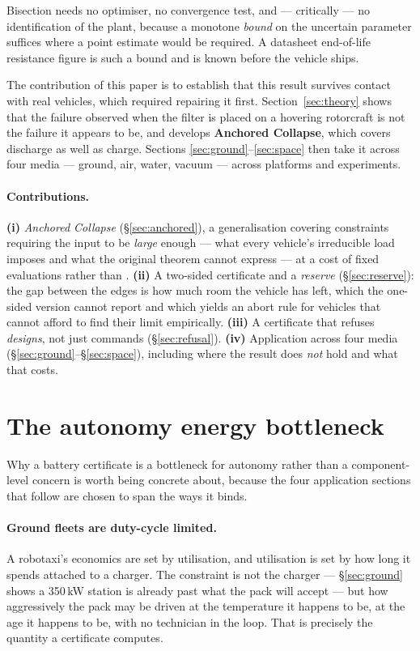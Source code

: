 \documentclass[11pt,letterpaper]{article}
\theoremstyle{definition}
\theoremstyle{remark}
\begin{document}
Bisection needs no optimiser, no convergence test, and --- critically --- no identification of
the plant, because a monotone \emph{bound} on the uncertain parameter suffices where a point
estimate would be required. A datasheet end-of-life resistance figure is such a bound and is
known before the vehicle ships.

The contribution of this paper is to establish that this result survives contact with real
vehicles, which required repairing it first. Section~\ref{sec:theory} shows that the failure
observed when the filter is placed on a hovering rotorcraft is not the failure it appears to be,
and develops \textbf{Anchored Collapse}, which covers discharge as well as charge. Sections
\ref{sec:ground}--\ref{sec:space} then take it across four media --- ground, air, water, vacuum
--- across \vPlatforms{} platforms and \vExperiments{} experiments.

\paragraph{Contributions.} \textbf{(i)} \emph{Anchored Collapse} (\S\ref{sec:anchored}), a
generalisation covering constraints requiring the input to be \emph{large} enough --- what every
vehicle's irreducible load imposes and what the original theorem cannot express --- at a cost of
\evalDischarge{} fixed evaluations rather than \evalCharge{}. \textbf{(ii)} A two-sided
certificate and a \emph{reserve} (\S\ref{sec:reserve}): the gap between the edges is how much
room the vehicle has left, which the one-sided version cannot report and which yields an abort
rule for vehicles that cannot afford to find their limit empirically. \textbf{(iii)} A
certificate that refuses \emph{designs}, not just commands (\S\ref{sec:refusal}).
\textbf{(iv)} Application across four media (\S\ref{sec:ground}--\S\ref{sec:space}), including
where the result does \emph{not} hold and what that costs.

\section{The autonomy energy bottleneck}\label{sec:bottleneck}

Why a battery certificate is a bottleneck for autonomy rather than a component-level concern is
worth being concrete about, because the four application sections that follow are chosen to span
the ways it binds.

\paragraph{Ground fleets are duty-cycle limited.} A robotaxi's economics are set by
utilisation, and utilisation is set by how long it spends attached to a charger. The
constraint is not the charger --- \S\ref{sec:ground} shows a 350\,kW station is already past
what the pack will accept --- but how aggressively the pack may be driven at the temperature it
happens to be, at the age it happens to be, with no technician in the loop. That is precisely
the quantity a certificate computes.
\end{document}
